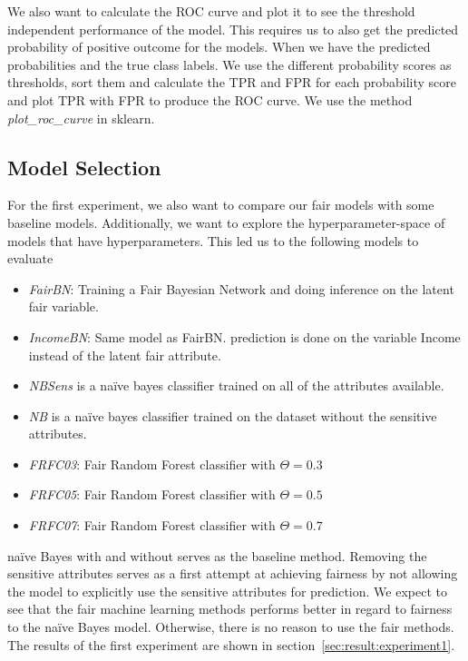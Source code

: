 We also want to calculate the ROC curve and plot it to see the threshold independent performance of the model. This requires us to also get the predicted probability of positive outcome for the models. When we have the predicted probabilities and the true class labels. We use the different probability scores as thresholds, sort them and calculate the TPR and FPR for each probability score and plot TPR with FPR to produce the ROC curve. We use the method \emph{plot\_roc\_curve} in sklearn.

\subsection{Model Selection}

For the first experiment, we also want to compare our fair models with some baseline models. Additionally, we want to explore the hyperparameter-space of models that have hyperparameters. This led us to the following models to evaluate

\begin{itemize}
    \item \emph{FairBN}: Training a Fair Bayesian Network and doing inference on the latent fair variable.
    \item  \emph{IncomeBN}: Same model as FairBN. prediction is done on the variable Income instead of the latent fair attribute.
    \item \emph{NBSens} is a naïve bayes classifier trained on all of the attributes available.
    \item \emph{NB} is a naïve bayes classifier trained on the dataset without the sensitive attributes.
    \item \emph{FRFC03}: Fair Random Forest classifier with $\Theta = 0.3$
    \item \emph{FRFC05}: Fair Random Forest classifier with $\Theta = 0.5$
    \item \emph{FRFC07}: Fair Random Forest classifier with $\Theta = 0.7$
\end{itemize}

naïve Bayes with and without serves as the baseline method. Removing the sensitive attributes serves as a first attempt at achieving fairness by not allowing the model to explicitly use the sensitive attributes for prediction. We expect to see that the fair machine learning methods performs better in regard to fairness to the naïve Bayes model. Otherwise, there is no reason to use the fair methods. The results of the first experiment are shown in section~\ref{sec:result:experiment1}.

